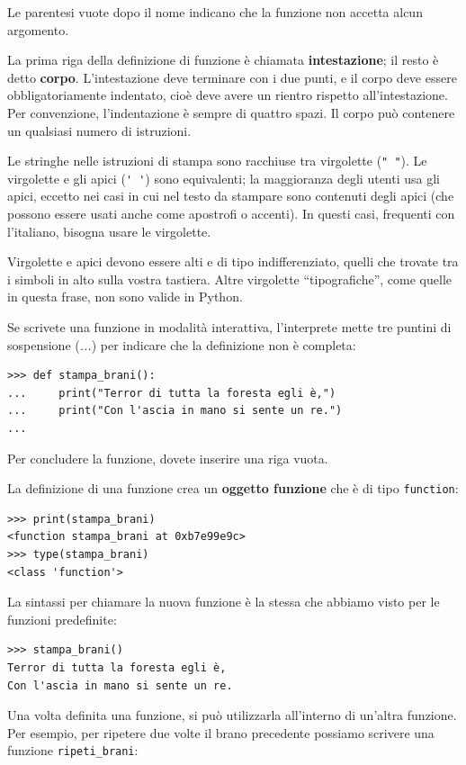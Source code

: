 \documentclass[10pt]{book}
\begin{document}
Le parentesi vuote dopo il nome indicano che la funzione non accetta alcun argomento.

La prima riga della definizione di funzione è chiamata {\bf intestazione};
il resto è detto {\bf corpo}. L'intestazione deve terminare con i due punti, e il corpo deve essere obbligatoriamente indentato, cioè deve avere un rientro rispetto all'intestazione. Per convenzione, l'indentazione è sempre di quattro spazi. Il corpo può contenere un qualsiasi numero di istruzioni.

Le stringhe nelle istruzioni di stampa sono racchiuse tra virgolette (\verb'" "'). Le virgolette e gli apici (\verb"' '") sono equivalenti; la maggioranza degli utenti usa gli apici, eccetto nei casi in cui nel testo da stampare sono contenuti degli apici (che possono essere usati anche come apostrofi o accenti). In questi casi, frequenti con l'italiano, bisogna usare le virgolette.

Virgolette e apici devono essere alti e di tipo indifferenziato, quelli che trovate tra i simboli in alto sulla vostra tastiera.  Altre virgolette ``tipografiche'', come quelle in questa frase, non sono valide in Python.

Se scrivete una funzione in modalità interattiva, l'interprete mette tre puntini di sospensione ({\em ...}) per indicare che la definizione non è completa:

\begin{verbatim}
>>> def stampa_brani():
...     print("Terror di tutta la foresta egli è,")
...     print("Con l'ascia in mano si sente un re.")
...
\end{verbatim}
%
Per concludere la funzione, dovete inserire una riga vuota.

La definizione di una funzione crea un {\bf oggetto funzione} che è di tipo \verb"function":

\begin{verbatim}
>>> print(stampa_brani)
<function stampa_brani at 0xb7e99e9c>
>>> type(stampa_brani)
<class 'function'>
\end{verbatim}
%

La sintassi per chiamare la nuova funzione è la stessa che abbiamo visto per le funzioni predefinite:

\begin{verbatim}
>>> stampa_brani()
Terror di tutta la foresta egli è,
Con l'ascia in mano si sente un re.
\end{verbatim}
%
Una volta definita una funzione, si può utilizzarla all'interno di un'altra funzione. Per esempio, per ripetere due volte il brano precedente possiamo scrivere una funzione \verb"ripeti_brani":
\end{document}
